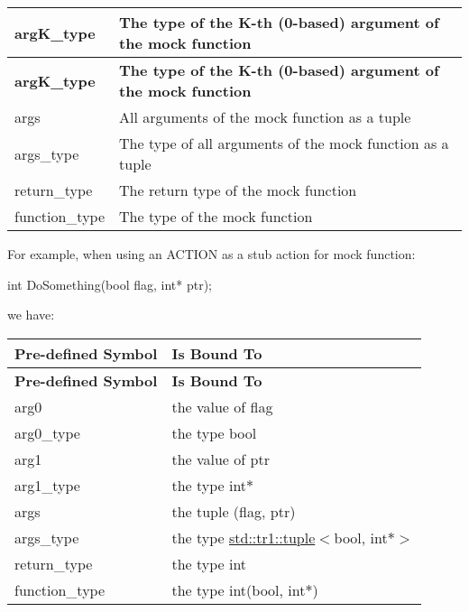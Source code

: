 \tabulinesep=1mm
\begin{longtabu} spread 0pt [c]{*{2}{|X[-1]}|}
\hline
\rowcolor{\tableheadbgcolor}\textbf{ {\ttfamily arg\+K\+\_\+type} }&\textbf{ The type of the K-\/th (0-\/based) argument of the mock function  }\\
\endfirsthead
\hline
\endfoot
\hline
\rowcolor{\tableheadbgcolor}\textbf{ {\ttfamily arg\+K\+\_\+type} }&\textbf{ The type of the K-\/th (0-\/based) argument of the mock function  }\\
\endhead
{\ttfamily args} &All arguments of the mock function as a tuple \\
{\ttfamily args\+\_\+type} &The type of all arguments of the mock function as a tuple \\
{\ttfamily return\+\_\+type} &The return type of the mock function \\
{\ttfamily function\+\_\+type} &The type of the mock function \\
\end{longtabu}
For example, when using an {\ttfamily A\+C\+T\+I\+ON} as a stub action for mock function\+: 
\begin{DoxyCode}
int DoSomething(bool flag, int* ptr);
\end{DoxyCode}
 we have\+: \tabulinesep=1mm
\begin{longtabu} spread 0pt [c]{*{2}{|X[-1]}|}
\hline
\rowcolor{\tableheadbgcolor}\textbf{ {\bfseries Pre-\/defined Symbol} }&\textbf{ {\bfseries Is Bound To}  }\\
\endfirsthead
\hline
\endfoot
\hline
\rowcolor{\tableheadbgcolor}\textbf{ {\bfseries Pre-\/defined Symbol} }&\textbf{ {\bfseries Is Bound To}  }\\
\endhead
{\ttfamily arg0} &the value of {\ttfamily flag} \\
{\ttfamily arg0\+\_\+type} &the type {\ttfamily bool} \\
{\ttfamily arg1} &the value of {\ttfamily ptr} \\
{\ttfamily arg1\+\_\+type} &the type {\ttfamily int$\ast$} \\
{\ttfamily args} &the tuple {\ttfamily (flag, ptr)} \\
{\ttfamily args\+\_\+type} &the type {\ttfamily \hyperlink{classstd_1_1tr1_1_1tuple}{std\+::tr1\+::tuple}$<$bool, int$\ast$$>$} \\
{\ttfamily return\+\_\+type} &the type {\ttfamily int} \\
{\ttfamily function\+\_\+type} &the type {\ttfamily int(bool, int$\ast$)} \\
\end{longtabu}
